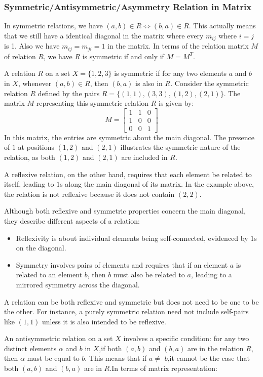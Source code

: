 	\subsubsection*{Symmetric/Antisymmetric/Asymmetry Relation in Matrix}
	In symmetric relations, we have $(a,b)\in R \iff (b,a)\in R$. This actually means that we still have a identical diagonal in the matrix where every $m_{ij}$ where $i=j$ is 1. Also we have $m_{ij} = m_{ji}=1$ in the matrix. In terms of the relation matrix $M$ of relation $R$, we have $R$ is symmetric if and only if $M=M^T$.
	\begin{example}[Symmetry]
		A relation \( R \) on a set \( X = \{1, 2, 3\} \) is symmetric if for any two elements \( a \) and \( b \) in \( X \), whenever \( (a, b) \in R \), then \( (b, a) \) is also in \( R \). Consider the symmetric relation \( R \) defined by the pairs \( R = \{(1, 1), (3, 3), (1, 2), (2, 1)\} \). The matrix \( M \) representing this symmetric relation \( R \) is given by:
		$$
		M = \begin{bmatrix}
			1 & 1 & 0 \\
			1 & 0 & 0 \\
			0 & 0 & 1
		\end{bmatrix}
		$$
		In this matrix, the entries are symmetric about the main diagonal. The presence of \( 1 \) at positions \( (1,2) \) and \( (2,1) \) illustrates the symmetric nature of the relation, as both \( (1,2) \) and \( (2,1) \) are included in \( R \).
		
		A reflexive relation, on the other hand, requires that each element be related to itself, leading to \( 1 \)s along the main diagonal of its matrix. In the example above, the relation is not reflexive because it does not contain \( (2, 2) \). 
		
		Although both reflexive and symmetric properties concern the main diagonal, they describe different aspects of a relation:
		\begin{itemize}
			\item Reflexivity is about individual elements being self-connected, evidenced by \( 1 \)s on the diagonal.
			\item Symmetry involves pairs of elements and requires that if an element \( a \) is related to an element \( b \), then \( b \) must also be related to \( a \), leading to a mirrored symmetry across the diagonal.
		\end{itemize}
		A relation can be both reflexive and symmetric but does not need to be one to be the other. For instance, a purely symmetric relation need not include self-pairs like \( (1, 1) \) unless it is also intended to be reflexive.
	\end{example}
	An antisymmetric relation on a set $X$ involves a specific condition: for any two distinct elements $\alpha$ and $b$ in $X$,if both $(a,b)$ and $(b,a)$ are in the relation $R$, then $\alpha$ must be equal to $b$. This means that if $a\neq$ $b$,it cannot be the case that both $(a,b)$ and $(b,a)$ are in $R$.In terms of matrix representation:
	
